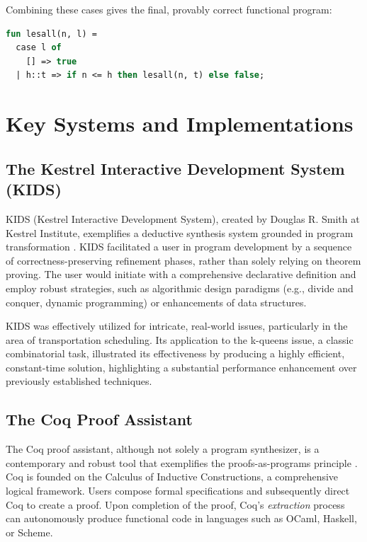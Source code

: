 \documentclass[12pt, a4paper]{report}
\begin{document}
Combining these cases gives the final, provably correct functional program:
\begin{lstlisting}[language=ML, caption={Synthesized `lesall` function in an ML-like syntax.}, label={lst:lesall}]
fun lesall(n, l) =
  case l of
    [] => true
  | h::t => if n <= h then lesall(n, t) else false;
\end{lstlisting}

\section{Key Systems and Implementations}

\subsection{The Kestrel Interactive Development System (KIDS)}
KIDS (Kestrel Interactive Development System), created by Douglas R. Smith at Kestrel Institute, exemplifies a deductive synthesis system grounded in program transformation \citep{smith1990kids}.  KIDS facilitated a user in program development by a sequence of correctness-preserving refinement phases, rather than solely relying on theorem proving.  The user would initiate with a comprehensive declarative definition and employ robust strategies, such as algorithmic design paradigms (e.g., divide and conquer, dynamic programming) or enhancements of data structures.

KIDS was effectively utilized for intricate, real-world issues, particularly in the area of transportation scheduling.  Its application to the k-queens issue, a classic combinatorial task, illustrated its effectiveness by producing a highly efficient, constant-time solution, highlighting a substantial performance enhancement over previously established techniques.

\subsection{The Coq Proof Assistant}
The Coq proof assistant, although not solely a program synthesizer, is a contemporary and robust tool that exemplifies the proofs-as-programs principle \citep{bertot2004interactive}.  Coq is founded on the Calculus of Inductive Constructions, a comprehensive logical framework.  Users compose formal specifications and subsequently direct Coq to create a proof.  Upon completion of the proof, Coq's \textit{extraction} process can autonomously produce functional code in languages such as OCaml, Haskell, or Scheme.
\end{document}

